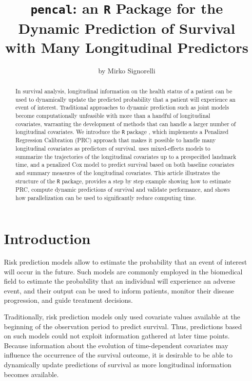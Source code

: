 \title{\texttt{pencal}: an \texttt{R} Package for the Dynamic Prediction
of Survival with Many Longitudinal Predictors}
\author{by Mirko Signorelli}

\maketitle

\begin{abstract}%
In survival analysis, longitudinal information on the health status of a
patient can be used to dynamically update the predicted probability that
a patient will experience an event of interest. Traditional approaches
to dynamic prediction such as joint models become computationally
unfeasible with more than a handful of longitudinal covariates,
warranting the development of methods that can handle a larger number of
longitudinal covariates. We introduce the \texttt{R} package
, which implements a Penalized Regression Calibration
(PRC) approach that makes it possible to handle many longitudinal
covariates as predictors of survival.  uses
mixed-effects models to summarize the trajectories of the longitudinal
covariates up to a prespecified landmark time, and a penalized Cox model
to predict survival based on both baseline covariates and summary
measures of the longitudinal covariates. This article illustrates the
structure of the \texttt{R} package, provides a step by step example
showing how to estimate PRC, compute dynamic predictions of survival and
validate performance, and shows how parallelization can be used to
significantly reduce computing time.
\end{abstract}

\section{Introduction}\label{introduction}

Risk prediction models \citep{steyerberg2009} allow to estimate the
probability that an event of interest will occur in the future. Such
models are commonly employed in the biomedical field to estimate the
probability that an individual will experience an adverse event, and
their output can be used to inform patients, monitor their disease
progression, and guide treatment decisions.

Traditionally, risk prediction models only used covariate values
available at the beginning of the observation period to predict
survival. Thus, predictions based on such models could not exploit
information gathered at later time points. Because information about the
evolution of time-dependent covariates may influence the occurrence of
the survival outcome, it is desirable to be able to dynamically update
predictions of survival as more longitudinal information becomes
available.

